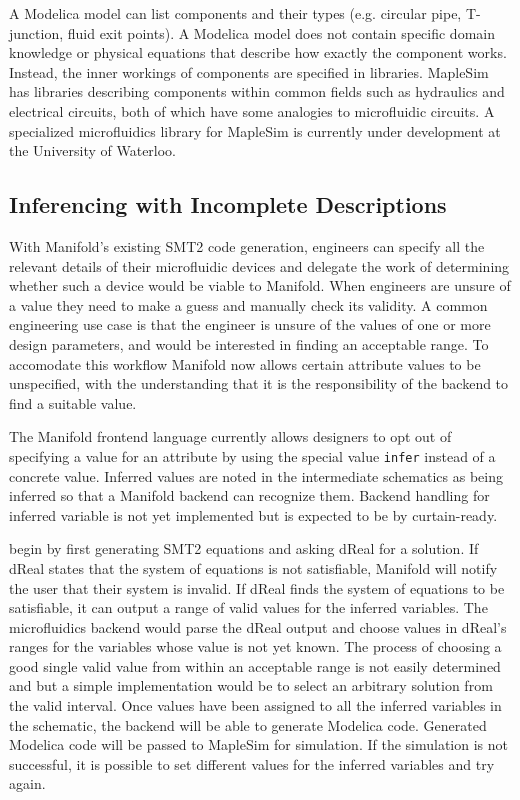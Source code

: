 A Modelica model can list components and their types (e.g. circular pipe, T-junction, fluid exit points).
A Modelica model does not contain specific domain knowledge or physical equations that describe how exactly the component works.
Instead, the inner workings of components are specified in libraries.
MapleSim has libraries describing components within common fields such as hydraulics and electrical circuits, both of which have some analogies to microfluidic circuits.
A specialized microfluidics library for MapleSim is currently under development at the University of Waterloo.

\subsection{Inferencing with Incomplete Descriptions}

With Manifold's existing SMT2 code generation, engineers can specify all the
relevant details of their microfluidic devices and delegate the work of
determining whether such a device would be viable to Manifold. When engineers
are unsure of a value they need to make a guess and manually check its validity.
A common engineering use case is that the engineer is unsure of the values of one or more design parameters, and would be interested in finding an acceptable range.
To accomodate this workflow Manifold now allows certain attribute values to be
unspecified, with the understanding that it is the
responsibility of the backend to find a suitable value.

The Manifold frontend language currently allows designers to opt out of
specifying a value for an attribute by using the special value {\tt infer}
instead of a concrete value.
Inferred values are noted in the intermediate schematics as being inferred so that a Manifold backend can recognize them.
Backend handling for inferred variable is not yet implemented but is expected to
be by curtain-ready.


begin by first generating SMT2 equations and asking dReal for a solution. If
dReal states that the system of equations is not satisfiable, Manifold will
notify the user that their system is invalid. If dReal finds the system of
equations to be satisfiable, it can output a range of valid values for the
inferred variables. The microfluidics backend would parse the dReal output and
choose values in dReal's ranges for the variables whose value is not yet
known. The process of choosing a good single valid value from within an
acceptable range is not easily determined and but a simple implementation
would be to select an arbitrary solution from the valid interval. Once values
have been assigned to all the inferred variables in the schematic, the backend
will be able to generate Modelica code. Generated Modelica code will be passed
to MapleSim for simulation. If the simulation is not successful, it is
possible to set different values for the inferred variables and try again.

